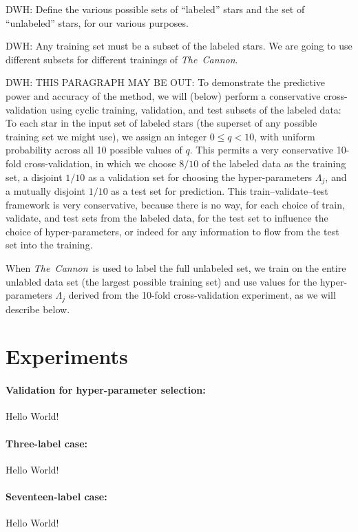 \documentclass[12pt,preprint]{aastex}
\newcommand{\project}[1]{\textsl{#1}}
\newcommand{\TheCannon}{\project{The~Cannon}}
\begin{document}
DWH: Define the various possible sets of ``labeled'' stars and the set of ``unlabeled''
stars, for our various purposes.

DWH: Any training set must be a subset of the
labeled stars.
We are going to use different subsets for different trainings of \TheCannon.

DWH: THIS PARAGRAPH MAY BE OUT:
To demonstrate the predictive power and accuracy of the method, we
will (below) perform a conservative cross-validation using cyclic
training, validation, and test subsets of the labeled data:
To each star in the input set of labeled stars (the superset of any
possible training set we might use), we assign an integer $0\leq
q<10$, with uniform probability across all 10 possible values of $q$.
This permits a very conservative 10-fold cross-validation, in which we
choose $8/10$ of the labeled data as the training set, a disjoint
$1/10$ as a validation set for choosing the hyper-parameters
$\Lambda_j$, and a mutually disjoint $1/10$ as a test set for
prediction.
This train--validate--test framework is very conservative, because there
is no way, for each choice of train, validate, and test sets from the
labeled data, for the test set to influence the choice of
hyper-parameters, or indeed for any information to flow from the test
set into the training.

When \TheCannon\ is used to label the full unlabeled set, we train on
the entire unlabled data set (the largest possible training set) and
use values for the hyper-parameters $\Lambda_j$ derived from the
10-fold cross-validation experiment, as we will describe below.

\section{Experiments}

\paragraph{Validation for hyper-parameter selection:}
Hello World!

\paragraph{Three-label case:}
Hello World!

\paragraph{Seventeen-label case:}
Hello World!
\end{document}
